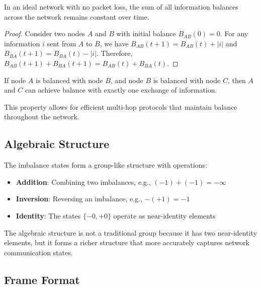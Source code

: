 \documentclass[../../../OAE-SPEC-MAIN.tex]{subfiles}
\begin{document}
\begin{highlightbox}
In an ideal network with no packet loss, the sum of all information balances across the network remains constant over time.
\end{highlightbox}

\begin{proof}
Consider two nodes $A$ and $B$ with initial balance $B_{AB}(0) = 0$. For any information $i$ sent from $A$ to $B$, we have $B_{AB}(t+1) = B_{AB}(t) + |i|$ and $B_{BA}(t+1) = B_{BA}(t) - |i|$. Therefore, $B_{AB}(t+1) + B_{BA}(t+1) = B_{AB}(t) + B_{BA}(t)$.
\end{proof}

\begin{highlightbox}
If node $A$ is balanced with node $B$, and node $B$ is balanced with node $C$, then $A$ and $C$ can achieve balance with exactly one exchange of information.
\end{highlightbox}

This property allows for efficient multi-hop protocols that maintain balance throughout the network.

\subsection{Algebraic Structure}

The imbalance states form a group-like structure with operations:

\begin{itemize}
    \item \textbf{Addition}: Combining two imbalances, e.g., $(-1) + (-1) = -\infty$
    \item \textbf{Inversion}: Reversing an imbalance, e.g., $-(+1) = -1$
    \item \textbf{Identity}: The states $\{-0, +0\}$ operate as near-identity elements
\end{itemize}

The algebraic structure is not a traditional group because it has two near-identity elements, but it forms a richer structure that more accurately captures network communication states.


\subsection{Frame Format}
\end{document}
